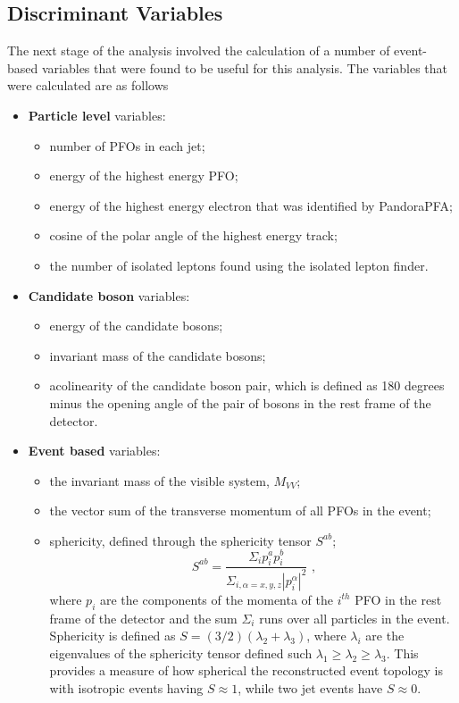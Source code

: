 \subsection{Discriminant Variables} 
\label{sec:analysisprocessor}
The next stage of the analysis involved the calculation of a number of event-based variables that were found to be useful for this analysis.  The variables that were calculated are as follows
%
\begin{itemize}
\item \textbf{Particle level} variables:

\begin{itemize}
\item number of PFOs in each jet;
\item energy of the highest energy PFO;
\item energy of the highest energy electron that was identified by PandoraPFA;
\item cosine of the polar angle of the highest energy track;
\item the number of isolated leptons found using the isolated lepton finder.
\end{itemize}

\item \textbf{Candidate boson} variables:
\begin{itemize}
\item energy of the candidate bosons;
\item invariant mass of the candidate bosons;
\item acolinearity of the candidate boson pair, which is defined as 180 degrees minus the opening angle of the pair of bosons in the rest frame of the detector.
\end{itemize}

\item \textbf{Event based} variables:  
\begin{itemize}
\item the invariant mass of the visible system, $M_{VV}$;
\item the vector sum of the transverse momentum of all PFOs in the event;
\item sphericity, defined through the sphericity tensor $S^{ab}$;
\begin{equation}
S^{ab} = \frac{\Sigma_{i}p^{a}_{i}p^{b}_{i}}{\Sigma_{i,\alpha=x,y,z}|p^{\alpha}_{i}|^{2}}\text{ ,}
\end{equation}
where $p_{i}$ are the components of the momenta of the $i^{th}$ PFO in the rest frame of the detector and the sum $\Sigma_{i}$ runs over all particles in the event.  Sphericity is defined as $S = (3/2)(\lambda_{2} + \lambda_{3})$, where $\lambda_{i}$ are the eigenvalues of the sphericity tensor defined such $\lambda_{1} \geq \lambda_{2} \geq \lambda_{3}$.  This provides a measure of how spherical the reconstructed event topology is with isotropic events having $S \approx 1$, while two jet events have $S \approx 0$.
\end{itemize}


\end{itemize}
